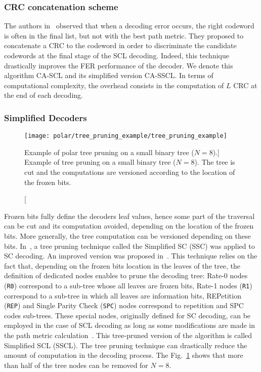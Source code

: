 \subsubsection{CRC concatenation scheme}

The authors in~\cite{Tal2011} observed that when a decoding error occurs, the
right codeword is often in the final list, but not with the best path metric.
They proposed to concatenate a CRC to the codeword in order to discriminate the
candidate codewords at the final stage of the SCL decoding. Indeed, this
technique drastically improves the FER performance of the decoder. We denote
this algorithm CA-SCL and its simplified version CA-SSCL. In terms of
computational complexity, the overhead consists in the computation of $L$ CRC at
the end of each decoding.

\subsubsection{Simplified Decoders}
\label{sec:alg_polar_simplified_decoders}

\begin{figure}[htp]
  \centering
  \texttt{[image: polar/tree\_pruning\_example/tree\_pruning\_example]}
  \caption
    [Example of polar tree pruning on a small binary tree ($N = 8$).]
    {Example of tree pruning on a small binary tree ($N = 8$). The tree is cut
    and the computations are versioned according to the location of the frozen
    bits.}
  \label{fig:tree_pruning_example}
\end{figure}

Frozen bits fully define the decoders leaf values, hence some part of the
traversal can be cut and its computation avoided, depending on the location of
the frozen bits. More generally, the tree computation can be versioned depending
on these bits. In~\cite{Alamdar-Yazdi2011}, a tree pruning technique called the
Simplified SC (SSC) was applied to SC decoding. An improved version was proposed
in~\cite{Sarkis2014a}. This technique relies on the fact that, depending on the
frozen bits location in the leaves of the tree, the definition of dedicated
nodes enables to prune the decoding tree: Rate-0 nodes (\verb|R0|) correspond to
a sub-tree whose all leaves are frozen bits, Rate-1 nodes (\verb|R1|) correspond
to a sub-tree in which all leaves are information bits, REPetition (\verb|REP|)
and Single Parity Check (\verb|SPC|) nodes correspond to repetition and SPC
codes sub-trees. These special nodes, originally defined for SC decoding, can be
employed in the case of SCL decoding as long as some modifications are made in
the path metric calculation~\cite{Sarkis2016}. This tree-pruned version of the
algorithm is called Simplified SCL (SSCL). The tree pruning technique can
drastically reduce the amount of computation in the decoding process. The
Fig.~\ref{fig:tree_pruning_example} shows that more than half of the tree nodes
can be removed for $N = 8$.

